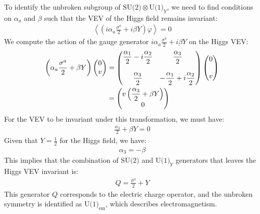 To identify the unbroken subgroup of $\text{SU(2)} \otimes \text{U(1)}_Y$, we need to find conditions on $\alpha_a$ and $\beta$ such that the VEV of the Higgs field remains invariant:
\begin{align}
    \left\langle \left(i \alpha_a \frac{\sigma^a}{2} + i \beta Y\right) \varphi \right\rangle = 0
\end{align}
We compute the action of the gauge generator $\displaystyle i \alpha_a \frac{\sigma^a}{2} + i \beta Y$ on the Higgs VEV:
\begin{align}
    \left( \alpha_a \frac{\sigma^a}{2} + \beta Y \right) \begin{pmatrix} 0 \\ v \end{pmatrix}
    &= \begin{pmatrix} \displaystyle\frac{\alpha_1}{2} - i \displaystyle\frac{\alpha_2}{2} & \displaystyle\frac{\alpha_3}{2} \\ \\
    \displaystyle\frac{\alpha_3}{2} & -\displaystyle\frac{\alpha_1}{2} + i \displaystyle\frac{\alpha_2}{2} \end{pmatrix} \begin{pmatrix} 0 \\ \\ v \end{pmatrix} \notag \\
    &= \begin{pmatrix} v \left(\displaystyle\frac{\alpha_3}{2} + \beta Y\right) \\ 0 \end{pmatrix}
\end{align}
For the VEV to be invariant under this transformation, we must have:
\begin{align*}
    \displaystyle\frac{\alpha_3}{2} + \beta Y = 0
\end{align*}
Given that $\displaystyle Y = \frac{1}{2}$ for the Higgs field, we have:
\begin{align*}
    \alpha_3 = - \beta
\end{align*}
This implies that the combination of $\text{SU(2)}$ and $\text{U(1)}_Y$ generators that leaves the Higgs VEV invariant is:
\begin{align}
    Q = \frac{\sigma^3}{2} + Y\label{eq:Q-hypercharge-def}
\end{align}
This generator $Q$ corresponds to the electric charge operator, and the unbroken symmetry is identified as $\text{U(1)}_{\text{em}}$, which describes electromagnetism.

